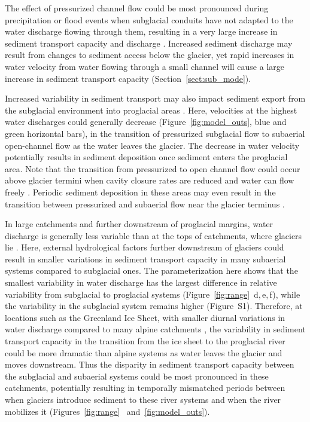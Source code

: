 \documentclass[11pt]{article}
\begin{document}
\begin{spacing}{1}
  The effect of pressurized channel flow could be most pronounced during precipitation or flood events when subglacial conduits have not adapted to the water discharge flowing through them, resulting in a very large increase in sediment transport capacity and discharge \citep[e.g.][]{cowan1988,delaney2019}.
  Increased sediment discharge may result from changes to sediment access below the glacier, yet rapid increases in water velocity from water flowing through a small channel will cause a large increase in sediment transport capacity (Section~\ref{sect:sub_mode}).
  
  Increased variability in sediment transport may also impact sediment export from the subglacial environment into proglacial areas \citep[e.g.][]{delaney2017,perolo2018}.
  Here, velocities at the highest water discharges could generally decrease (Figure~\ref{fig:model_outs}, blue and green horizontal bars), in the transition of pressurized subglacial flow to subaerial open-channel flow as the water leaves the glacier. The decrease in water velocity potentially results in sediment deposition once sediment enters the proglacial area.
  Note that the transition from pressurized to open channel flow could occur above glacier termini when cavity closure rates are reduced and water can flow freely \citep{egli2021b}. 
  Periodic sediment deposition in these areas may even result in the transition between pressurized and subaerial flow near the glacier terminus \citep{perolo2018}.
  
  In large catchments and further downstream of proglacial margins, water discharge is generally less variable than at the tops of catchments, where glaciers lie \citep[c.f.][]{costa2017,vanas2017,delaney2018,hasholt2018}.
  Here, external hydrological factors further downstream of glaciers could result in smaller variations in sediment transport capacity in many subaerial systems compared to subglacial ones.
  The parameterization here shows that the smallest variability in water discharge has the largest difference in relative variability from subglacial to proglacial systems (Figure~\ref{fig:range}\, d,\,e,\,f), while the variability in the subglacial system remains higher (Figure~S1).
  Therefore, at locations such as the Greenland Ice Sheet, with smaller diurnal variations in water discharge compared to many alpine catchments \citep[c.f.][]{delaney2018,hasholt2018}, the variability in sediment transport capacity in the transition from the ice sheet to the proglacial river could be more dramatic than alpine systems as water leaves the glacier and moves downstream.
  Thus the disparity in sediment transport capacity between the subglacial and subaerial systems could be most pronounced in these catchments, potentially resulting in temporally mismatched periods between when glaciers introduce sediment to these river systems  and when the river mobilizes it (Figures~\ref{fig:range}~ and~\ref{fig:model_outs}).
  

\end{spacing}
\end{document}
